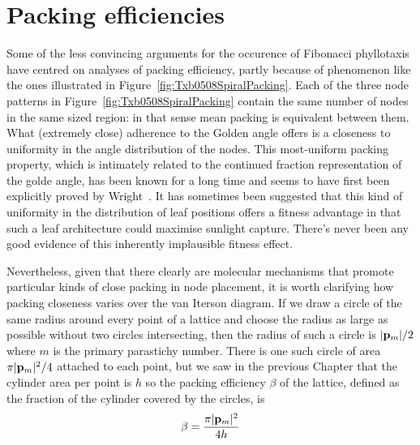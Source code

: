 \section{Packing efficiencies}
Some of the less convincing arguments for the occurence of Fibonacci phyllotaxis have centred on analyses of packing efficiency, partly because of phenomenon like the ones illustrated in Figure~\ref{fig:Txb0508SpiralPacking}.%
%
Each of the three node patterns in Figure~\ref{fig:Txb0508SpiralPacking} contain the same number of nodes in the same sized region: in that sense mean packing is equivalent between them. What (extremely close) adherence to the Golden angle offers is a closeness to uniformity in the angle distribution of the nodes. This most-uniform packing property, which is intimately related to the continued fraction representation of the golde angle, has been known for a long time and seems to have first been explicitly proved by Wright~\cite{wrightMostThoroughUniform1859}. It has sometimes been suggested that this kind of uniformity in the distribution of leaf positions offers a fitness advantage in that such a leaf architecture could maximise sunlight capture. There's never been any good evidence of this inherently implausible fitness effect.

Nevertheless, given that there clearly are molecular mechanisms that promote particular kinds of close packing in node placement, it is worth clarifying how packing closeness varies over the van Iterson diagram.  If we  draw a circle of the same radius around every point of a lattice and choose the radius as large as possible without two circles intersecting, then the radius of such a circle is $|{\mathbf p}_{m}|/2$ where $m$ is the primary parastichy number. There is one such circle of area $ {\pi |{\mathbf p}_{m}|^2 }/{4}$ attached to each point, but we saw in the previous Chapter that the cylinder area per point is $h$ so  the packing efficiency $\beta$ of the lattice, defined as the fraction of the cylinder covered by the circles, is
\[
\beta = \frac{ \pi |{\mathbf p}_{m}|^2 }{4 h}
\]


